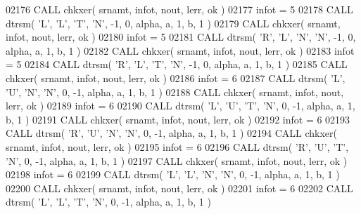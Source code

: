 \begin{DoxyCode}
02176       \textcolor{keyword}{CALL }chkxer( srnamt, infot, nout, lerr, ok )
02177       infot = 5
02178       \textcolor{keyword}{CALL }dtrsm( \textcolor{stringliteral}{'L'}, \textcolor{stringliteral}{'L'}, \textcolor{stringliteral}{'T'}, \textcolor{stringliteral}{'N'}, -1, 0, alpha, a, 1, b, 1 )
02179       \textcolor{keyword}{CALL }chkxer( srnamt, infot, nout, lerr, ok )
02180       infot = 5
02181       \textcolor{keyword}{CALL }dtrsm( \textcolor{stringliteral}{'R'}, \textcolor{stringliteral}{'L'}, \textcolor{stringliteral}{'N'}, \textcolor{stringliteral}{'N'}, -1, 0, alpha, a, 1, b, 1 )
02182       \textcolor{keyword}{CALL }chkxer( srnamt, infot, nout, lerr, ok )
02183       infot = 5
02184       \textcolor{keyword}{CALL }dtrsm( \textcolor{stringliteral}{'R'}, \textcolor{stringliteral}{'L'}, \textcolor{stringliteral}{'T'}, \textcolor{stringliteral}{'N'}, -1, 0, alpha, a, 1, b, 1 )
02185       \textcolor{keyword}{CALL }chkxer( srnamt, infot, nout, lerr, ok )
02186       infot = 6
02187       \textcolor{keyword}{CALL }dtrsm( \textcolor{stringliteral}{'L'}, \textcolor{stringliteral}{'U'}, \textcolor{stringliteral}{'N'}, \textcolor{stringliteral}{'N'}, 0, -1, alpha, a, 1, b, 1 )
02188       \textcolor{keyword}{CALL }chkxer( srnamt, infot, nout, lerr, ok )
02189       infot = 6
02190       \textcolor{keyword}{CALL }dtrsm( \textcolor{stringliteral}{'L'}, \textcolor{stringliteral}{'U'}, \textcolor{stringliteral}{'T'}, \textcolor{stringliteral}{'N'}, 0, -1, alpha, a, 1, b, 1 )
02191       \textcolor{keyword}{CALL }chkxer( srnamt, infot, nout, lerr, ok )
02192       infot = 6
02193       \textcolor{keyword}{CALL }dtrsm( \textcolor{stringliteral}{'R'}, \textcolor{stringliteral}{'U'}, \textcolor{stringliteral}{'N'}, \textcolor{stringliteral}{'N'}, 0, -1, alpha, a, 1, b, 1 )
02194       \textcolor{keyword}{CALL }chkxer( srnamt, infot, nout, lerr, ok )
02195       infot = 6
02196       \textcolor{keyword}{CALL }dtrsm( \textcolor{stringliteral}{'R'}, \textcolor{stringliteral}{'U'}, \textcolor{stringliteral}{'T'}, \textcolor{stringliteral}{'N'}, 0, -1, alpha, a, 1, b, 1 )
02197       \textcolor{keyword}{CALL }chkxer( srnamt, infot, nout, lerr, ok )
02198       infot = 6
02199       \textcolor{keyword}{CALL }dtrsm( \textcolor{stringliteral}{'L'}, \textcolor{stringliteral}{'L'}, \textcolor{stringliteral}{'N'}, \textcolor{stringliteral}{'N'}, 0, -1, alpha, a, 1, b, 1 )
02200       \textcolor{keyword}{CALL }chkxer( srnamt, infot, nout, lerr, ok )
02201       infot = 6
02202       \textcolor{keyword}{CALL }dtrsm( \textcolor{stringliteral}{'L'}, \textcolor{stringliteral}{'L'}, \textcolor{stringliteral}{'T'}, \textcolor{stringliteral}{'N'}, 0, -1, alpha, a, 1, b, 1 )

\end{DoxyCode}
